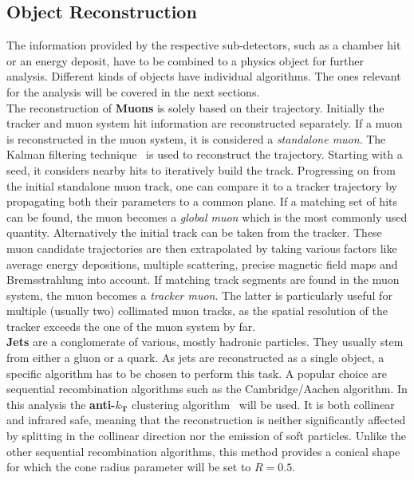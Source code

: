 \subsection{Object Reconstruction}
\label{sec:objreco}

The information provided by the respective sub-detectors, such as a chamber hit or an energy deposit, have to be combined to a physics object for further analysis. Different kinds of objects have individual algorithms. The ones relevant for the analysis will be covered in the next sections. \\

The reconstruction of \textbf{Muons} is solely based on their trajectory. Initially the tracker and muon system hit information are reconstructed separately. If a muon is reconstructed in the muon system, it is considered a \textit{standalone muon}. The Kalman filtering technique~\cite{kalman} is used to reconstruct the trajectory. Starting with a seed, it considers nearby hits to iteratively build the track. Progressing on from the initial standalone muon track, one can compare it to a tracker trajectory by propagating both their parameters to a common plane. If a matching set of hits can be found, the muon becomes a \textit{global muon} which is the most commonly used quantity. Alternatively the initial track can be taken from the tracker. These muon candidate trajectories are then extrapolated by taking various factors like average energy depositions, multiple scattering, precise magnetic field maps and Bremsstrahlung into account. If matching track segments are found in the muon system, the muon becomes a \textit{tracker muon}. The latter is particularly useful for multiple (usually two) collimated muon tracks, as the spatial resolution of the tracker exceeds the one of the muon system by far. \\

\textbf{Jets} are a conglomerate of various, mostly hadronic particles. They usually stem from either a gluon or a quark. As jets are reconstructed as a single object, a specific algorithm has to be chosen to perform this task. A popular choice are sequential recombination algorithms such as the Cambridge/Aachen algorithm. In this analysis the \textbf{anti-$k_\textbf{T}$} clustering algorithm~\cite{antikt} will be used. It is both collinear and infrared safe, meaning that the reconstruction is neither significantly affected by splitting in the collinear direction nor the emission of soft particles. Unlike the other sequential recombination algorithms, this method provides a conical shape for which the cone radius parameter will be set to $R = 0.5$.


